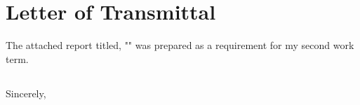 \chapter*{Letter of Transmittal}
\makeatletter %

The attached report titled, "\@title" was prepared as a requirement for my second work term.

\section*{}

\closing{Sincerely, \\
     \\
}
